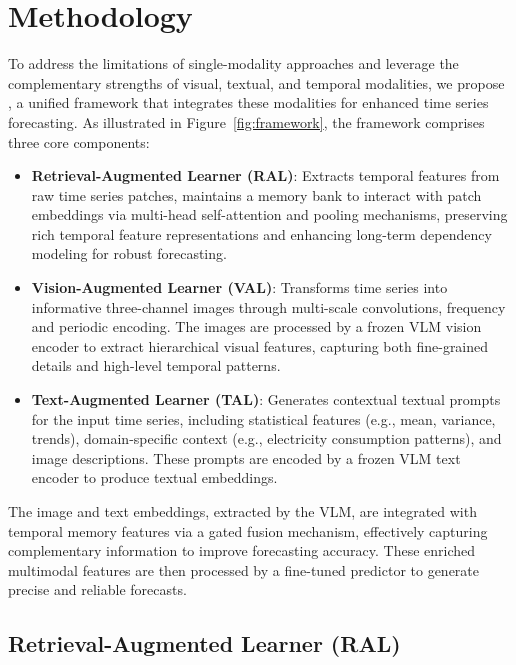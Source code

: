 \section{Methodology}

To address the limitations of single-modality approaches and leverage the complementary strengths of visual, textual, and temporal modalities, we propose \method, a unified framework that integrates these modalities for enhanced time series forecasting. As illustrated in Figure~\ref{fig:framework}, the framework comprises three core components:

\vspace{-1em}
\begin{itemize}[leftmargin=*, itemsep=0pt]    
    \item \textbf{Retrieval-Augmented Learner (RAL)}: Extracts temporal features from raw time series patches, maintains a memory bank to interact with patch embeddings via multi-head self-attention and pooling mechanisms, preserving rich temporal feature representations and enhancing long-term dependency modeling for robust forecasting.
    \item \textbf{Vision-Augmented Learner (VAL)}: Transforms time series into informative three-channel images through multi-scale convolutions, frequency and periodic encoding. The images are processed by a frozen VLM vision encoder to extract hierarchical visual features, capturing both fine-grained details and high-level temporal patterns.
    \item \textbf{Text-Augmented Learner (TAL)}: Generates contextual textual prompts for the input time series, including statistical features (e.g., mean, variance, trends), domain-specific context (e.g., electricity consumption patterns), and image descriptions. These prompts are encoded by a frozen VLM text encoder to produce textual embeddings.
\end{itemize}
\vspace{-1em}

The image and text embeddings, extracted by the VLM, are integrated with temporal memory features via a gated fusion mechanism, effectively capturing complementary information to improve forecasting accuracy. These enriched multimodal features are then processed by a fine-tuned predictor to generate precise and reliable forecasts.

\subsection{Retrieval-Augmented Learner (RAL)}

